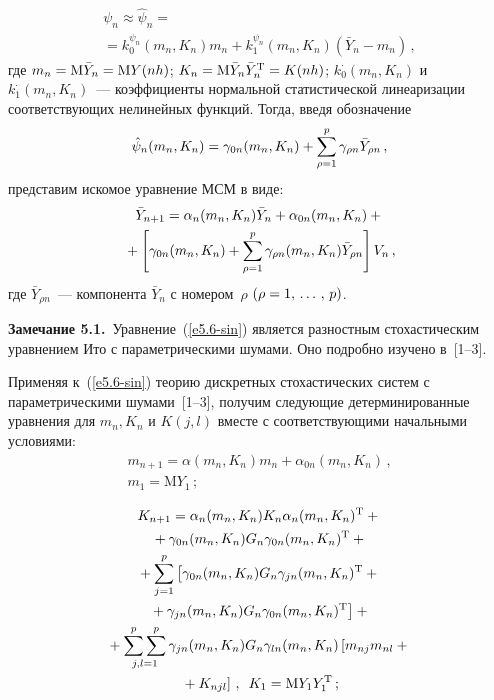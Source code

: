 \begin{multicols}{2}
    \begin{multline*}
    \psi_{n}\approx \hat \psi_{n} ={}\\
    {}= k_0^{\psi_n} (m_n, K_n) m_n + k_1^{\psi_n} (m_n, K_n) (\bar Y_n - m_n)\,, %
    \end{multline*}
где $m_n= {\mathrm{M}} \bar Y_n \hm= {\mathrm{M}} Y(nh)$; 
$K_n \hm={\mathrm{M}}\bar Y_n \bar Y_n^{\mathrm{T}}\hm= K(nh)$; $k_0^\cdot (m_n, K_n)$ и $k_1^\cdot (m_n, K_n)$~--- 
коэффициенты нормальной статистической линеаризации соответствующих нелинейных функций. Тогда, введя обозначение
 \begin{equation*}
 \hat\psi_n (m_n, K_n) =\gamma_{0n} (m_n, K_n) +\sss_{\rho=1}^p \gamma_{\rho n} \bar Y_{\rho n}\,, %
 \end{equation*}
представим искомое уравнение МСМ в виде:
\begin{multline}
\bar Y_{n+1} = \alpha_n (m_n, K_n) \bar Y_n +\alpha_{0n} (m_n, K_n)+{}\\
{}+\left[ 
\gamma_{0n} (m_n, K_n)+\sum\limits_{\rho=1}^p \gamma_{\rho n} (m_n, K_n)\bar Y_{\rho n}\right] V_n\,,\label{e5.6-sin}
\end{multline}
где $\bar Y_{\rho n}$~--- компонента $\bar Y_n$ с номером~$\rho$ $(\rho\hm=1\tr p)$.

\smallskip

\noindent
{\small \textbf{Замечание 5.1.}\ 
Уравнение~(\ref{e5.6-sin}) является разностным стохастическим уравнением Ито с параметрическими шумами. Оно подробно изучено в~[1--3].}

Применяя к~(\ref{e5.6-sin}) теорию дискретных стохастических систем с параметрическими шумами~[1--3], 
получим следующие детерминированные уравнения для $m_n, K_n$ и $K(j,l)$ вместе с соответствующими начальными 
условиями:
\begin{multline}
m_{n+1} = \alpha (m_n, K_n) m_n +\alpha_{0n} (m_n, K_n)\,,\\ m_1 =\mathrm{M} Y_1\,;\label{e5.7-sin}
\end{multline}

\vspace*{-12pt}

\noindent
\begin{multline}
K_{n+1} =\alpha_n (m_n, K_n)K_n \alpha_n(m_n, K_n)^{\mathrm{T}}+{}\\
{}+\gamma_{0n} (m_n, K_n)G_n \gamma_{0n} (m_n, K_n)^{\mathrm{T}} +{}\\
    {}+ \sss_{j=1}^p \left[  \gamma_{0n} (m_n, K_n)G_n \gamma_{jn}(m_n, K_n)^{\mathrm{T}}+ {}\right.\\
    \left.{}+\gamma_{jn} (m_n, K_n) G_n \gamma_{0n}(m_n, K_n)^{\mathrm{T}}\right]+{}\\
    {}+\ss2\limits_{j,l=1} \gamma_{jn}(m_n, K_n)G_n \gamma_{ln}(m_n, K_n) \left[ m_{nj} m_{nl} +{}\right.\\
    \left.{}+ K_{njl}\right]\,,\enskip K_1 ={\mathrm{M}} Y_1 Y_1^{\mathrm{T}}\,;
    \label{e5.8-sin}
    \end{multline}


\end{multicols}

